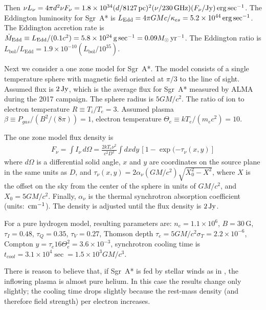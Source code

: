 \documentclass[twocolumn,tighten,dvipsnames]{aastex63}
\newcommand\sgra{Sgr~A*\xspace}
\newcommand\mbh{{M}} %
\newcommand\msun{{M_\odot}}
\newcommand\yr{{\rm \, yr}}
\newcommand\erg{{\rm \, erg}}
\newcommand\Jy{{\rm \, Jy}}
\newcommand\cm{{\rm \, cm}}
\newcommand\pc{{\rm \, pc}}
\newcommand\gm{{\rm \, g}}
\newcommand\GHz{{\rm \, GHz}}
\newcommand\<{{\langle}}
\renewcommand\>{{\rangle}} %
\begin{document}
Then
$\nu L_\nu = 4 \pi d^2 \nu F_\nu = 1.8 \times 10^{34} (d/8127 \pc)^2 (\nu/230 \GHz)(F_\nu/{\rm Jy}) \erg \sec^{-1}$.
The Eddington luminosity for \sgra is
$L_\mathrm{Edd} = 4\pi G\mbh c/\kappa_{es} = 5.2 \times 10^{44} \erg\sec^{-1}$.
The Eddington accretion rate is
$\dot\mbh_\mathrm{Edd} \equiv L_\mathrm{Edd}/(0.1 c^2) = 5.8 \times 10^{24} \gm \sec^{-1} = 0.09 \msun \yr^{-1}$.
The Eddington ratio is
$L_\mathrm{bol}/L_\mathrm{Edd} = 1.9 \times 10^{-10} (L_\mathrm{bol}/10^{35})$.

Next we consider a one zone model for \sgra.
The model consists of a single temperature sphere with magnetic field
oriented at $\pi/3$ to the line of sight.
Assumed flux is $2\Jy$, which is the average flux for \sgra measured
by ALMA during the 2017 campaign.
The sphere radius is
$5 G\mbh/c^2$.
The ratio of ion to electron temperature
$R \equiv T_i/T_e = 3$.
Assumed plasma
$\beta \equiv P_{gas}/(B^2/(8\pi)) = 1$,
electron temperature
$\Theta_e \equiv k T_e/(m_e c^2) = 10$.

The one zone model flux density is
\begin{align}
  F_\nu = \int I_\nu \, d\Omega =
  \frac{2 k T_e \nu^2}{c^2 D^2} \int dx dy\,\left[1 - \exp(-\tau_\nu(x,y)\right]
\end{align}
where $d\Omega$ is a differential solid angle, $x$ and $y$ are
coordinates on the source plane in the same units as $D$, and
$\tau_\nu(x,y) = 2 \alpha_\nu (G\mbh/c^2) \sqrt{X_0^2 - X^2}$,
where $X$ is the offset on the sky from the center of the sphere in
units of
$GM/c^2$, and $X_0 = 5 G\mbh/c^2$.
Finally, $\alpha_\nu$ is the thermal synchrotron absorption
coefficient (units: $\cm^{-1}$).
The density is adjusted until the flux density is $2\Jy$.

For a pure hydrogen model, resulting parameters are: $n_e = 1.1 \times
10^6$, $B = 30\,\mathrm{G}$, $\tau_I = 0.48$, $\tau_Q = 0.35 $,
$\tau_V = 0.27$, Thomson depth $\tau_e = 5 G\mbh/c^2 \sigma_T = 2.2
\times 10^{-6}$, Compton $y = \tau_e 16 \Theta_e^2 = 3.6 \times
10^{-3}$, synchrotron cooling time is $t_{cool} = 3.1 \times 10^4\sec
= 1.5 \times 10^3 G\mbh/c^3$.

There is reason to believe that, if \sgra is fed by stellar winds as
in \citet{2019MNRAS.482L.123R}, the inflowing plasma is almost pure
helium.
In this case the results change only slightly; the cooling time drops
slightly because the rest-mass density (and therefore field strength)
per electron increases.

\end{document}

